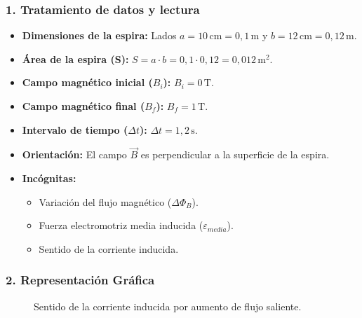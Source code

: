 \subsubsection*{1. Tratamiento de datos y lectura}
\begin{itemize}
    \item \textbf{Dimensiones de la espira:} Lados $a=10\,\text{cm}=0,1\,\text{m}$ y $b=12\,\text{cm}=0,12\,\text{m}$.
    \item \textbf{Área de la espira (S):} $S = a \cdot b = 0,1 \cdot 0,12 = 0,012\,\text{m}^2$.
    \item \textbf{Campo magnético inicial ($B_i$):} $B_i = 0\,\text{T}$.
    \item \textbf{Campo magnético final ($B_f$):} $B_f = 1\,\text{T}$.
    \item \textbf{Intervalo de tiempo ($\Delta t$):} $\Delta t = 1,2\,\text{s}$.
    \item \textbf{Orientación:} El campo $\vec{B}$ es perpendicular a la superficie de la espira.
    \item \textbf{Incógnitas:}
    \begin{itemize}
        \item Variación del flujo magnético ($\Delta\Phi_B$).
        \item Fuerza electromotriz media inducida ($\varepsilon_{media}$).
        \item Sentido de la corriente inducida.
    \end{itemize}
\end{itemize}

\subsubsection*{2. Representación Gráfica}
\begin{figure}[H]
    \centering
    \caption{Sentido de la corriente inducida por aumento de flujo saliente.}
\end{figure}

